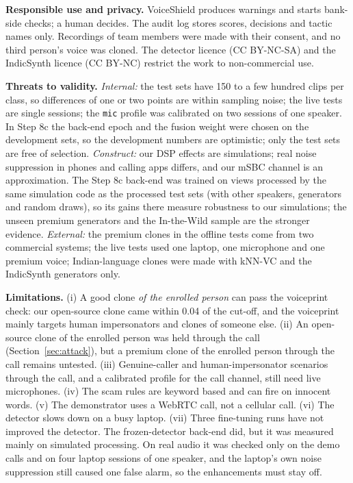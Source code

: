 \documentclass[10pt,a4paper,twocolumn]{article}
\begin{document}
\textbf{Responsible use and privacy.} VoiceShield produces warnings and starts bank-side checks; a human decides. The audit log stores scores, decisions and tactic names only. Recordings of team members were made with their consent, and no third person's voice was cloned. The detector licence (CC BY-NC-SA) and the IndicSynth licence (CC BY-NC) restrict the work to non-commercial use.

\textbf{Threats to validity.} \emph{Internal:} the test sets have 150 to a few hundred clips per class, so differences of one or two points are within sampling noise; the live tests are single sessions; the \texttt{mic} profile was calibrated on two sessions of one speaker. In Step 8c the back-end epoch and the fusion weight were chosen on the development sets, so the development numbers are optimistic; only the test sets are free of selection. \emph{Construct:} our DSP effects are simulations; real noise suppression in phones and calling apps differs, and our mSBC channel is an approximation. The Step 8c back-end was trained on views processed by the same simulation code as the processed test sets (with other speakers, generators and random draws), so its gains there measure robustness to our simulations; the unseen premium generators and the In-the-Wild sample are the stronger evidence. \emph{External:} the premium clones in the offline tests come from two commercial systems; the live tests used one laptop, one microphone and one premium voice; Indian-language clones were made with kNN-VC and the IndicSynth generators only.

\textbf{Limitations.}
\label{sec:limits}
(i) A good clone \emph{of the enrolled person} can pass the voiceprint check: our open-source clone came within 0.04 of the cut-off, and the voiceprint mainly targets human impersonators and clones of someone else. (ii) An open-source clone of the enrolled person was held through the call (Section~\ref{sec:attack}), but a premium clone of the enrolled person through the call remains untested. (iii) Genuine-caller and human-impersonator scenarios through the call, and a calibrated profile for the call channel, still need live microphones. (iv) The scam rules are keyword based and can fire on innocent words. (v) The demonstrator uses a WebRTC call, not a cellular call. (vi) The detector slows down on a busy laptop. (vii) Three fine-tuning runs have not improved the detector. The frozen-detector back-end did, but it was measured mainly on simulated processing. On real audio it was checked only on the demo calls and on four laptop sessions of one speaker, and the laptop's own noise suppression still caused one false alarm, so the enhancements must stay off.
\end{document}
